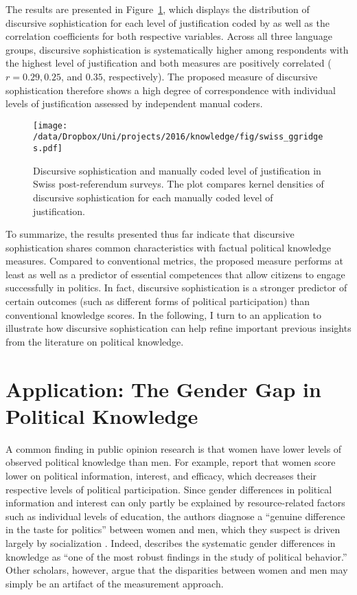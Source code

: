 The results are presented in Figure~\ref{fig:swiss_ggridges}, which displays the distribution of discursive sophistication for each level of justification coded by \citet{colombo2016justifications} as well as the correlation coefficients for both respective variables. Across all three language groups, discursive sophistication is systematically higher among respondents with the highest level of justification and both measures are positively correlated ($r=0.29, 0.25$, and $0.35$, respectively). The proposed measure of discursive sophistication therefore shows a high degree of correspondence with individual levels of justification assessed by independent manual coders.

\begin{figure}[h]\centering
\texttt{[image: /data/Dropbox/Uni/projects/2016/knowledge/fig/swiss\_ggridges.pdf]}
\caption[Discursive sophistication and manually coded level of justification in Swiss post-referendum surveys]{Discursive sophistication and manually coded level of justification \citep{colombo2016justifications} in Swiss post-referendum surveys. The plot compares kernel densities of discursive sophistication for each manually coded level of justification.}\label{fig:swiss_ggridges}
\end{figure}

To summarize, the results presented thus far indicate that discursive sophistication shares common characteristics with factual political knowledge measures. Compared to conventional metrics, the proposed measure performs at least as well as a predictor of essential competences that allow citizens to engage successfully in politics. In fact, discursive sophistication is a stronger predictor of certain outcomes (such as different forms of political participation) than conventional knowledge scores. In the following, I turn to an application to illustrate how discursive sophistication can help refine important previous insights from the literature on political knowledge.

\section*{Application: The Gender Gap in Political Knowledge}

A common finding in public opinion research is that women have lower levels of observed political knowledge than men. For example, \citet{verba1997knowing} report that women score lower on political information, interest, and efficacy, which decreases their respective levels of political participation. Since gender differences in political information and interest can only partly be explained by resource-related factors such as individual levels of education, the authors diagnose a ``genuine difference in the taste for politics'' between women and men, which they suspect is driven largely by socialization \citep[see also][]{wolak2011roots}. Indeed, \citet[117]{dow2009gender} describes the systematic gender differences in knowledge as ``one of the most robust findings in the study of political behavior.'' Other scholars, however, argue that the disparities between women and men may simply be an artifact of the measurement approach.

